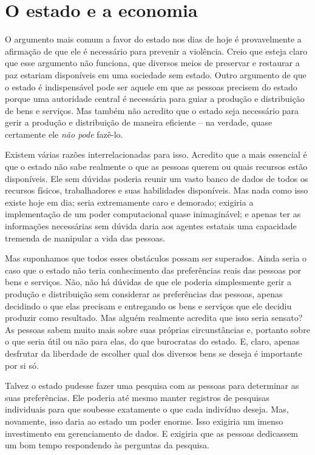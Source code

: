 \section{O estado e a economia}

O argumento mais comum a favor do estado nos dias de hoje é provavelmente a afirmação de que ele é necessário para prevenir a violência. Creio que esteja claro que esse argumento não funciona, que diversos meios de preservar e restaurar a paz estariam disponíveis em uma sociedade sem estado. Outro argumento de que o estado é indispensável pode ser aquele em que as pessoas precisem do estado porque uma autoridade central é necessária para guiar a produção e distribuição de bens e serviços. Mas também não acredito que o estado seja necessário para gerir a produção e distribuição de maneira eficiente -- na verdade, quase certamente ele \emph{não pode} fazê-lo.

Existem várias razões interrelacionadas para isso. Acredito que a mais essencial é que o estado não sabe realmente o que as pessoas querem ou quais recursos estão disponíveis. Ele sem dúvidas poderia reunir um vasto banco de dados de todos os recursos físicos, trabalhadores e suas habilidades disponíveis. Mas nada como isso existe hoje em dia; seria extremamente caro e demorado; exigiria a implementação de um poder computacional quase inimaginável; e apenas ter as informações necessárias sem dúvida daria aos agentes estatais uma capacidade tremenda de manipular a vida das pessoas.

Mas suponhamos que todos esses obstáculos possam ser superados. Ainda seria o caso que o estado não teria conhecimento das preferências reais das pessoas por bens e serviços. Não, não há dúvidas de que ele poderia simplesmente gerir a produção e distribuição sem considerar as preferências das pessoas, apenas decidindo o que elas precisam e entregando os bens e serviços que ele decidiu produzir como resultado. Mas alguém realmente acredita que isso seria sensato? As pessoas sabem muito mais sobre suas próprias circunstâncias e, portanto sobre o que seria útil ou não para elas, do que burocratas do estado. E, claro, apenas desfrutar da liberdade de escolher qual dos diversos bens se deseja é importante por si só.

Talvez o estado pudesse fazer uma pesquisa com as pessoas para determinar as suas preferências. Ele poderia até mesmo manter registros de pesquisas individuais para que soubesse exatamente o que cada indivíduo deseja. Mas, novamente, isso daria ao estado um poder enorme. Isso exigiria um imenso investimento em gerenciamento de dados. E exigiria que as pessoas dedicassem um bom tempo respondendo às perguntas da pesquisa.

